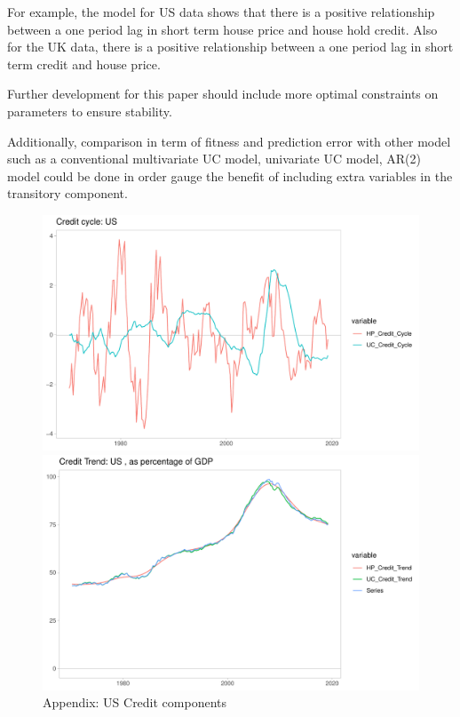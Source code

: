 \documentclass[fleqn]{article}
\begin{document}
\begin{outline}[enumerate]
For example, the model for US data shows that there is a positive relationship between a one period lag in short term house price and house hold credit. Also for the UK data, there is a positive relationship between a one period lag in short term credit and house price.

Further development for this paper should include more optimal constraints on parameters to ensure stability. 

Additionally, comparison in term of fitness and prediction error with other model such as a conventional multivariate UC model, univariate UC model, AR(2) model could be done in order gauge the benefit of including extra variables in the transitory component.

\begin{figure}[h!]
\caption{Appendix: US Credit components}	
\centerline{\includegraphics[scale=0.7]{../Output/Graphs/Credit_cycle_US.pdf}}
\centerline{\includegraphics[scale=0.7]{../Output/Graphs/Credit_trend_US.pdf}}
\end{figure}


\end{outline}
\end{document}
